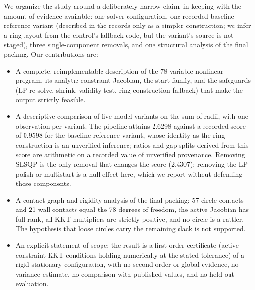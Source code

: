 \documentclass{article} %
\begin{document}
We organize the study around a deliberately narrow claim, in keeping with the amount of evidence available: one solver configuration, one recorded baseline-reference variant (described in the records only as a simpler construction; we infer a ring layout from the control's fallback code, but the variant's source is not staged), three single-component removals, and one structural analysis of the final packing.
Our contributions are:
\begin{itemize}
\item A complete, reimplementable description of the 78-variable nonlinear program, its analytic constraint Jacobian, the start family, and the safeguards (LP re-solve, shrink, validity test, ring-construction fallback) that make the output strictly feasible.
\item A descriptive comparison of five model variants on the sum of radii, with one observation per variant. The pipeline attains 2.6298 against a recorded score of 0.9598 for the baseline-reference variant, whose identity as the ring construction is an unverified inference; ratios and gap splits derived from this score are arithmetic on a recorded value of unverified provenance. Removing SLSQP is the only removal that changes the score (2.4307); removing the LP polish or multistart is a null effect here, which we report without defending those components.
\item A contact-graph and rigidity analysis of the final packing: 57 circle contacts and 21 wall contacts equal the 78 degrees of freedom, the active Jacobian has full rank, all KKT multipliers are strictly positive, and no circle is a rattler. The hypothesis that loose circles carry the remaining slack is not supported.
\item An explicit statement of scope: the result is a first-order certificate (active-constraint KKT conditions holding numerically at the stated tolerance) of a rigid stationary configuration, with no second-order or global evidence, no variance estimate, no comparison with published values, and no held-out evaluation.
\end{itemize}
\end{document}
